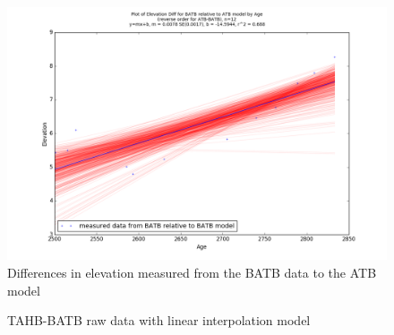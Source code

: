 \begin{figure}[t]
	\includegraphics[width=0.9\linewidth]{data/gias/theGIA_BATB_relative_to_ATB.png}
	\caption{Differences in elevation measured from the BATB data to the ATB model}
	\label{fig:gias_BATBxATB}
\end{figure}
\newpage



\begin{figure}[h]
	\caption{TAHB-BATB raw data with linear interpolation model}
	\label{fig:data_TAHBxBATB}
\end{figure}
\newpage

